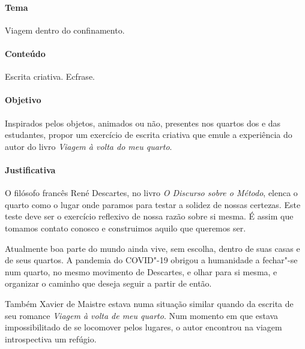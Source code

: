 \documentclass[12pt]{extarticle}
\begin{document}
\paragraph{Tema} Viagem dentro do confinamento. 

\paragraph{Conteúdo} Escrita criativa. Ecfrase. 

\paragraph{Objetivo} Inspirados pelos objetos, animados ou não, 
presentes nos quartos dos e das estudantes, propor um exercício 
de escrita criativa que emule a experiência do autor do livro
\textit{Viagem à volta do meu quarto}.

\paragraph{Justificativa}
O filósofo francês René Descartes, no livro \textit{O Discurso sobre o Método}, 
elenca o quarto como o lugar onde paramos para testar a solidez de nossas certezas. 
Este teste deve ser o exercício reflexivo de nossa razão sobre si mesma. É assim
que tomamos contato conosco e construimos aquilo que queremos ser. 

Atualmente boa parte do mundo ainda vive, sem escolha, dentro de suas
casas e de seus quartos. A pandemia do COVID"-19 obrigou a humanidade
a fechar"-se num quarto, no mesmo movimento de Descartes, e olhar para  
si mesma, e organizar o caminho que deseja seguir a partir de então. 

Também Xavier de Maistre estava numa situação similar quando da 
escrita de seu romance \textit{Viagem à volta de meu quarto}. 
Num momento em que estava impossibilitado de se locomover pelos
lugares, o autor encontrou na viagem introspectiva um refúgio. 
\end{document}
